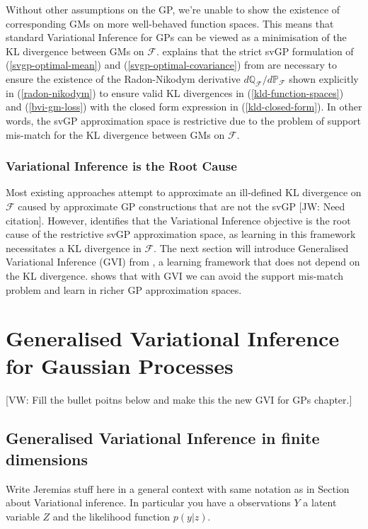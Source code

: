\documentclass{article}
\newcommand{\jw}[1]{{\color{gray} [JW: #1]}}
\newcommand{\vw}[1]{{\color{green} [VW: #1]}}
\numberwithin{equation}{section}
\begin{document}
Without other assumptions on the GP, we're unable to show the existence of corresponding GMs on more well-behaved function spaces. This means that standard Variational Inference for GPs can be viewed as a minimisation of the KL divergence between GMs on $\mathcal{F}$. \cite{matthews2017scalable} explains that the strict svGP formulation of (\ref{svgp-optimal-mean}) and (\ref{svgp-optimal-covariance}) from \cite{titsias2009variational} are necessary to ensure the existence of the Radon-Nikodym derivative $d \mathbb{Q}_\mathcal{F}/d \mathbb{P}_\mathcal{F}$ shown explicitly in (\ref{radon-nikodym}) to ensure valid KL divergences in (\ref{kld-function-spaces}) and (\ref{bvi-gm-loss}) with the closed form expression in (\ref{kld-closed-form}). In other words, the svGP approximation space is restrictive due to the problem of support mis-match for the KL divergence between GMs on $\mathcal{F}$.

\subsubsection{Variational Inference is the Root Cause}
Most existing approaches attempt to approximate an ill-defined KL divergence on $\mathcal{F}$ caused by approximate GP constructions that are not the svGP \jw{Need citation}. However, \cite{wild2022generalized} identifies that the Variational Inference objective is the root cause of the restrictive svGP approximation space, as learning in this framework necessitates a KL divergence in $\mathcal{F}$. The next section will introduce Generalised Variational Inference (GVI) from \cite{knoblauch2022optimization}, a learning framework that does not depend on the KL divergence. \cite{wild2022generalized} shows that with GVI we can avoid the support mis-match problem and learn in richer GP approximation spaces.

\newpage


\section{Generalised Variational Inference for Gaussian Processes}
\vw{Fill the bullet poitns below and make this the new GVI for GPs chapter.}

\subsection{Generalised Variational Inference in finite dimensions}

Write Jeremias stuff here in a general context with same notation as in Section about Variational inference. In particular you have a observations $Y$ a latent variable $Z$ and the likelihood function $p(y|z)$.
\end{document}
